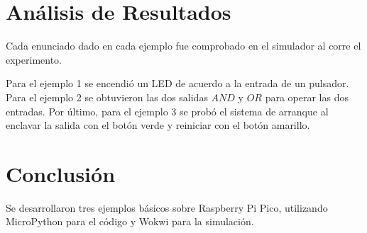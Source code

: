 \documentclass{article}
\begin{document}
    \section{Análisis de Resultados}\label{sec:análisis-de-resultados}


    Cada enunciado dado en cada ejemplo fue comprobado en el simulador al
    corre el experimento.

    \bigbreak

    Para el ejemplo 1 se encendió un LED de acuerdo a la entrada de un
    pulsador. Para el ejemplo 2 se obtuvieron las dos salidas $AND$ y $OR$
    para operar las dos entradas. Por último, para el ejemplo 3 se probó el
    sistema de arranque al enclavar la salida con el botón verde y reiniciar
    con el botón amarillo.

    \section{Conclusión}\label{sec:conclusion}

    Se desarrollaron tres ejemplos básicos sobre Raspberry Pi Pico,
    utilizando MicroPython para el código y Wokwi para la simulación.

    \printbibliography
\end{document}
